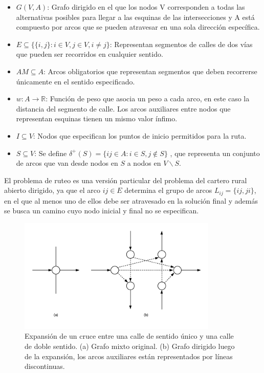 \documentclass[spanish, conference]{IEEEtran}
\begin{document}
\begin{itemize}
\item $G(V, A)$: Grafo dirigido en el que los nodos V corresponden a todas las alternativas posibles para llegar a las esquinas de las intersecciones y A está compuesto por arcos que se pueden atravesar en una sola dirección específica.

\item $E \subseteq \{ \{i, j\}: i \in V, j \in V, i \neq j\}$: Representan segmentos de calles de dos vías que pueden ser recorridos en cualquier sentido.

\item $AM \subseteq A $: Arcos obligatorios que representan segmentos que deben recorrerse únicamente en el sentido especificado.

\item $w : A \rightarrow \mathbb{R} $: Función de peso que asocia un peso a cada arco, en este caso la distancia del segmento de calle. Los arcos auxiliares entre nodos que representan esquinas tienen un mismo valor ínfimo.

\item $I \subseteq V $: Nodos que especifican los puntos de inicio permitidos para la ruta.

\item $S \subseteq V$: Se define $\delta^+ (S) = \{i j \in A: i \in S , j \notin S \}$ , que representa un conjunto de arcos que van desde nodos en $S$ a nodos en $V \backslash S$.
\end{itemize}

El problema de ruteo es una versión particular del problema del cartero rural abierto dirigido, ya que el arco $i j \in E $ determina el grupo de arcos $L_{i j} = \{i j, j i\}$, en el que al menos uno de ellos debe ser atravesado en la solución final y además se busca un camino cuyo nodo inicial y final no se especifican.

\begin{figure}[tbp]
\centerline{\includegraphics[width=9.5cm]{imagenes/expanded_graph.png}}
\caption{Expansión de un cruce entre una calle de sentido único y una calle de doble sentido. (a) Grafo mixto original. (b) Grafo dirigido luego de la expansión, los arcos auxiliares están representados por líneas discontinuas. \cite{Braier2017AnArgentina}}
\label{fig:grafo_expandido}
\end{figure}
\end{document}
